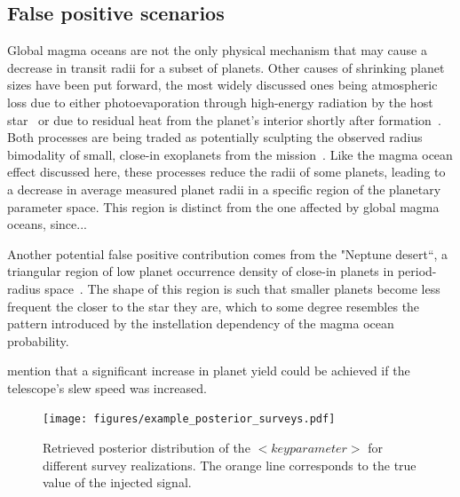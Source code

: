 \documentclass[modern]{aastex631}
\begin{document}
\subsection{False positive scenarios}
\begin{note}
Global magma oceans are not the only physical mechanism that may cause a decrease in transit radii for a subset of planets.
Other causes of shrinking planet sizes have been put forward, the most widely discussed ones being atmospheric loss due to either photoevaporation through high-energy radiation by the host star~\citep[e.g.,][]{Owen2013,Jin2014,Mordasini2020a} or due to residual heat from the planet's interior shortly after formation~\citep{Ginzburg2016b,Ginzburg2018,Gupta2019}.
    Both processes are being traded as potentially sculpting the observed radius bimodality of small, close-in exoplanets from the  mission~\citep{Fulton2017,VanEylen2018}.
    Like the magma ocean effect discussed here, these processes reduce the radii of some planets, leading to a decrease in average measured planet radii in a specific region of the planetary parameter space.
    This region is distinct from the one affected by global magma oceans, since... 

    Another potential false positive contribution comes from the "Neptune desert``, a triangular region of low planet occurrence density of close-in planets in period-radius space~\citep{Szabo2011,Mazeh2016,Dreizler2020b}.
    The shape of this region is such that smaller planets become less frequent the closer to the star they are, which to some degree resembles the pattern introduced by the instellation dependency of the magma ocean probability.
\end{note}


\begin{note}
    \citet{Penny2019} mention that a significant increase in planet yield could be achieved if the telescope's slew speed was increased.
\end{note}

\begin{figure}[ht!]
    \begin{centering}

        \texttt{[image: figures/example\_posterior\_surveys.pdf]}
        \caption{
        Retrieved posterior distribution of the $<key parameter>$ for different survey realizations.
        The orange line corresponds to the true value of the injected signal.
        }
        \label{fig:posterior_surveys}
    \end{centering}
\end{figure}
\end{document}
